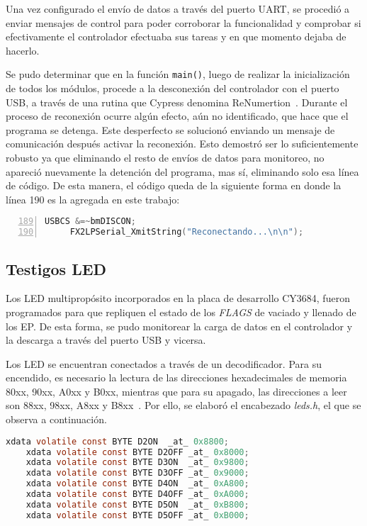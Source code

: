 Una vez configurado el envío de datos a través del puerto UART, se procedió a enviar mensajes de control para poder corroborar la funcionalidad y comprobar si efectivamente el controlador efectuaba sus tareas y en que momento dejaba de hacerlo.

Se pudo determinar que en la función \verb|main()|, luego de realizar la inicialización de todos los módulos, procede a la desconexión del controlador con el puerto USB, a través de una rutina que Cypress denomina ReNumertion~\cite{CypressSemiconductor2014fx2lp}. Durante el proceso de reconexión ocurre algún efecto, aún no identificado, que hace que el programa se detenga. Este desperfecto se solucionó enviando un mensaje de comunicación después activar la reconexión. Esto demostró ser lo suficientemente robusto ya que eliminando el resto de envíos de datos para monitoreo, no apareció nuevamente la detención del programa, mas sí, eliminando solo esa línea de código. De esta manera, el código queda de la siguiente forma en donde la línea 190 es la agregada en este trabajo:

\begin{lstlisting}[language=C,backgroundcolor=\color{gray!30},numbers=left,firstnumber=189,basicstyle=\footnotesize]
	 USBCS &=~bmDISCON;
	 FX2LPSerial_XmitString("Reconectando...\n\n");
\end{lstlisting}

\subsection{Testigos LED}
Los LED multipropósito incorporados en la placa de desarrollo CY3684, fueron programados para que repliquen el estado de los \textit{FLAGS} de vaciado y llenado de los EP. De esta forma, se pudo monitorear la carga de datos en el controlador y la descarga a través del puerto USB y vicersa.

Los LED se encuentran conectados a través de un decodificador. Para su encendido, es necesario la lectura de las direcciones hexadecimales de memoria 80xx, 90xx, A0xx y B0xx, mientras que para su apagado, las direcciones a leer son  88xx, 98xx, A8xx y B8xx~\cite{CypressSemiconductor2014cy3684}. Por ello, se elaboró el encabezado {\it leds.h}, el que se observa a continuación.
	
	\begin{lstlisting}[language=C,backgroundcolor=\color{gray!30}]
	xdata volatile const BYTE D2ON	_at_ 0x8800;
	xdata volatile const BYTE D2OFF	_at_ 0x8000;
	xdata volatile const BYTE D3ON	_at_ 0x9800;
	xdata volatile const BYTE D3OFF	_at_ 0x9000;
	xdata volatile const BYTE D4ON	_at_ 0xA800;
	xdata volatile const BYTE D4OFF	_at_ 0xA000;
	xdata volatile const BYTE D5ON	_at_ 0xB800;
	xdata volatile const BYTE D5OFF	_at_ 0xB000;	\end{lstlisting}
	
